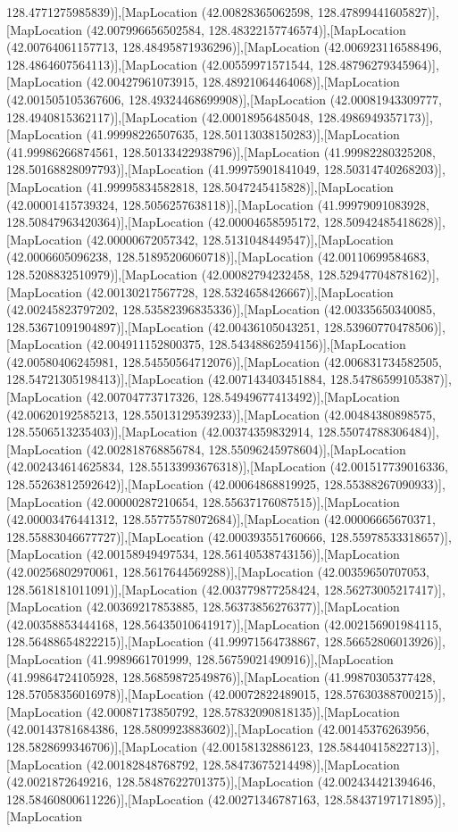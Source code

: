 128.4771275985839)],[MapLocation (42.00828365062598, 128.47899441605827)],[MapLocation (42.007996656502584, 128.48322157746574)],[MapLocation (42.00764061157713, 128.48495871936296)],[MapLocation (42.006923116588496, 128.4864607564113)],[MapLocation (42.00559971571544, 128.48796279345964)],[MapLocation (42.00427961073915, 128.48921064464068)],[MapLocation (42.001505105367606, 128.49324468699908)],[MapLocation (42.00081943309777, 128.4940815362117)],[MapLocation (42.00018956485048, 128.4986949357173)],[MapLocation (41.99998226507635, 128.50113038150283)],[MapLocation (41.99986266874561, 128.50133422938796)],[MapLocation (41.99982280325208, 128.50168828097793)],[MapLocation (41.99975901841049, 128.50314740268203)],[MapLocation (41.99995834582818, 128.5047245415828)],[MapLocation (42.00001415739324, 128.5056257638118)],[MapLocation (41.99979091083928, 128.50847963420364)],[MapLocation (42.00004658595172, 128.50942485418628)],[MapLocation (42.00000672057342, 128.5131048449547)],[MapLocation (42.0006605096238, 128.51895206060718)],[MapLocation (42.00110699584683, 128.5208832510979)],[MapLocation (42.00082794232458, 128.52947704878162)],[MapLocation (42.00130217567728, 128.5324658426667)],[MapLocation (42.00245823797202, 128.53582396835336)],[MapLocation (42.00335650340085, 128.53671091904897)],[MapLocation (42.00436105043251, 128.53960770478506)],[MapLocation (42.004911152800375, 128.54348862594156)],[MapLocation (42.00580406245981, 128.54550564712076)],[MapLocation (42.006831734582505, 128.54721305198413)],[MapLocation (42.007143403451884, 128.54786599105387)],[MapLocation (42.00704773717326, 128.54949677413492)],[MapLocation (42.00620192585213, 128.55013129539233)],[MapLocation (42.00484380898575, 128.5506513235403)],[MapLocation (42.00374359832914, 128.55074788306484)],[MapLocation (42.002818768856784, 128.55096245978604)],[MapLocation (42.002434614625834, 128.55133993676318)],[MapLocation (42.001517739016336, 128.55263812592642)],[MapLocation (42.00064868819925, 128.55388267090933)],[MapLocation (42.00000287210654, 128.55637176087515)],[MapLocation (42.00003476441312, 128.55775578072684)],[MapLocation (42.00006665670371, 128.55883046677727)],[MapLocation (42.000393551760666, 128.55978533318657)],[MapLocation (42.00158949497534, 128.56140538743156)],[MapLocation (42.00256802970061, 128.5617644569288)],[MapLocation (42.00359650707053, 128.5618181011091)],[MapLocation (42.003779877258424, 128.56273005217417)],[MapLocation (42.00369217853885, 128.56373856276377)],[MapLocation (42.00358853444168, 128.56435010641917)],[MapLocation (42.002156901984115, 128.56488654822215)],[MapLocation (41.99971564738867, 128.56652806013926)],[MapLocation (41.9989661701999, 128.56759021490916)],[MapLocation (41.99864724105928, 128.56859872549876)],[MapLocation (41.99870305377428, 128.57058356016978)],[MapLocation (42.00072822489015, 128.57630388700215)],[MapLocation (42.00087173850792, 128.57832090818135)],[MapLocation (42.00143781684386, 128.5809923883602)],[MapLocation (42.00145376263956, 128.5828699346706)],[MapLocation (42.00158132886123, 128.58440415822713)],[MapLocation (42.00182848768792, 128.58473675214498)],[MapLocation (42.0021872649216, 128.58487622701375)],[MapLocation (42.002434421394646, 128.58460800611226)],[MapLocation (42.00271346787163, 128.58437197171895)],[MapLocation 